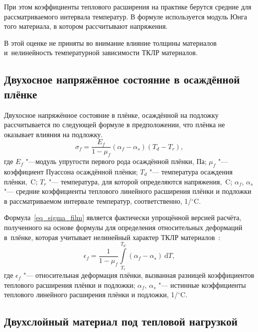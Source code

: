 При этом коэффициенты теплового расширения на практике берутся средние для рассматриваемого интервала температур. В формуле используется модуль Юнга того материала, в котором рассчитывают напряжения.

В этой оценке не приняты во внимание влияние толщины материалов и~нелинейность
температурной зависимости ТКЛР материалов.

\subsection{Двухосное напряжённое состояние в осаждённой плёнке}
Двухосное напряжённое состояние в плёнке, осаждённой на подложку~\cite{Adams_Elasticity_ppt} рассчитывается по следующей формуле в предположении, что плёнка не оказывает влияния на подложку.
\begin{equation}
    \label{eq_sigma_film}
    \sigma _f=\frac{E_f}{1-\mu _f}\left(\alpha _f-\alpha _s\right)(T_d-T_r),
\end{equation}
где $ E_f $ "---модуль упругости первого рода осаждённой плёнки, Па; $\mu_f$ "--- коэффициент Пуассона осаждённой плёнки; $ T_d $ "--- температура осаждения плёнки,~{\textdegree}C; $ T_r $ "--- температура, для которой определяются напряжения,~{\textdegree}C; $\alpha_f$, $\alpha_s$ "--- средние коэффициенты теплового линейного расширения плёнки и подложки в рассматриваемом интервале температур, соответственно, 1/${}^\circ$C.

Формула~\eqref{eq_sigma_film} является фактически упрощённой версией расчёта,
полученного на основе формулы для определения относительных деформаций в~плёнке,
которая учитывает нелинейный характер ТКЛР
материалов~\cite{gleskova2009mechanical}:
\[
    \epsilon_f
    =
    \frac{1}{1-\mu_f}
    \int\limits_{T_r}^{T_d}
    (\alpha_f-\alpha_s)\:\mathrm{d}T,
\]
где $\epsilon_f$ "--- относительная деформация плёнки, вызванная разницей коэффициентов теплового расширения плёнки и подложки; $\alpha_f$, $\alpha_s$ "--- истинные коэффициенты теплового линейного расширения плёнки и подложки, 1/${}^\circ$C.

\subsection{Двухслойный материал под тепловой нагрузкой}

